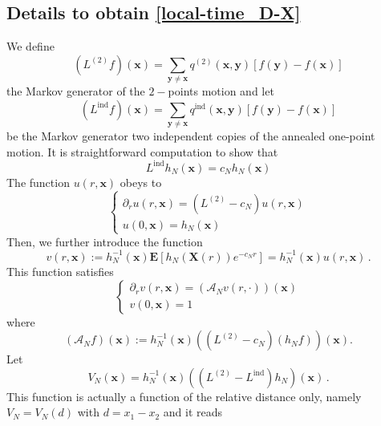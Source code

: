 \documentclass[a4paper,11pt,oneside,reqno]{amsart}
\theoremstyle{definition}
\numberwithin{equation}{section}
\begin{document}
{\subsection{Details to obtain \eqref{local-time_D-X}} 
We define
\begin{equation*}
	(L^{(2)}f)(\bm{x})=\sum_{\bm{y}\neq \bm{x}}q^{(2)}(\bm{x},\bm{y})[f(\bm{y})-f(\bm{x})]
\end{equation*}
the Markov generator of the $2-$points motion and let
\begin{equation*}
	(L^{\text{ind}}f)(\bm{x})=\sum_{\bm{y}\neq \bm{x}}q^{\text{ind}}(\bm{x},\bm{y})[f(\bm{y})-f(\bm{x})]
\end{equation*}
be the Markov generator two independent copies of the annealed one-point motion. It is straightforward computation to show that 
\begin{equation*}
	L^{\text{ind}}h_{N}(\bm{x})=c_{N}h_{N}(\bm{x})
\end{equation*}
The function $u(r,\bm{x})$ obeys to
\begin{equation*}
	\begin{cases}\partial_{r}u(r,\bm{x})= (L^{(2)}-c_{N})u(r,\bm{x})
		\\u(0,\bm{x})=h_{N}(\bm{x})
	\end{cases}
\end{equation*}
Then, we further introduce the function
\begin{equation*}
	v(r,\bm{x}):= h_{N}^{-1}(\bm{x})\mathbf{E}\left[h_{N}(\bm{X}(r))e^{-c_{N}r}\right]=h_{N}^{-1}(\bm{x})u(r,\bm{x})\,.
\end{equation*}
This function satisfies
\begin{equation*}
	\begin{cases}
		\partial_{r}v(r,\bm{x})= (\mathcal{A}_{N}v(r,\cdot))(\bm{x})\\
		v(0,\bm{x})=1
	\end{cases}
\end{equation*}
where
\begin{equation*}
	(\mathcal{A}_{N} f)(\bm{x})
	:=
	h_{N}^{-1}(\bm{x})
	\left((L^{(2)}-c_{N})(h_{N}f)\right)(\bm{x}).
\end{equation*}
Let
\begin{equation*}
	V_{N}(\bm{x})=h_{N}^{-1}(\bm{x}) \left(\left(L^{(2)}-L^{\text{ind}}\right)h_{N}\right)(\bm{x})\,.
\end{equation*}
This function is actually a function of the relative distance only, namely $V_{N}=V_{N}(d)$ with $d=x_{1}-x_{2}$ and it reads
\begin{equation*}

\end{equation*}}
\end{document}
